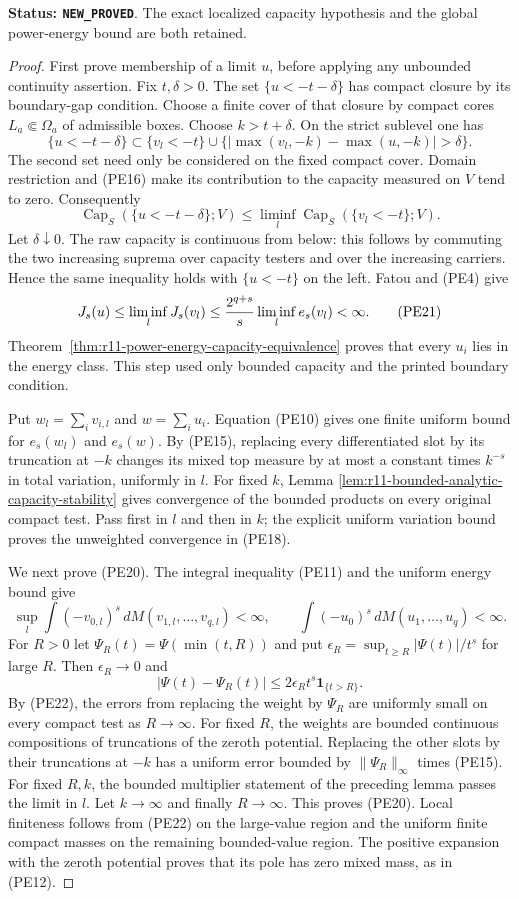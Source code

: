 \noindent\textbf{Status: \texttt{NEW\_PROVED}}. The exact
localized capacity hypothesis and the global power-energy bound
are both retained.

\begin{proof}
First prove membership of a limit $u$, before applying any
unbounded continuity assertion. Fix $t,\delta>0$. The set
$\{u<-t-\delta\}$ has compact closure by its boundary-gap
condition. Choose a finite cover of that closure by compact
cores $L_a\Subset\Omega_a$ of admissible boxes. Choose
$k>t+\delta$. On the strict sublevel one has
\[
 \{u<-t-\delta\}
 \subset\{v_l<-t\}\cup
       \{|\max(v_l,-k)-\max(u,-k)|>\delta\}.
\]
The second set need only be considered on the fixed compact
cover. Domain restriction and (PE16) make its contribution to
the capacity measured on $V$ tend to zero. Consequently
\[
 \operatorname{Cap}_S(\{u<-t-\delta\};V)
       \leq\liminf_l\operatorname{Cap}_S(\{v_l<-t\};V).
\]
Let $\delta\downarrow0$. The raw capacity is continuous from
below: this follows by commuting the two increasing suprema
over capacity testers and over the increasing carriers. Hence
the same inequality holds with $\{u<-t\}$ on the left.
Fatou and (PE4) give
\[
 J_s(u)\leq\liminf_lJ_s(v_l)
       \leq {2^{q+s}\over s}\liminf_l e_s(v_l)<\infty.
 \tag{PE21}
\]
Theorem~\ref{thm:r11-power-energy-capacity-equivalence} proves
that every $u_i$ lies in the energy class. This step used only
bounded capacity and the printed boundary condition.

Put $w_l=\sum_i v_{i,l}$ and $w=\sum_i u_i$.
Equation (PE10) gives one finite uniform bound for $e_s(w_l)$
and $e_s(w)$. By (PE15), replacing every differentiated slot
by its truncation at $-k$ changes its mixed top measure by at
most a constant times $k^{-s}$ in total variation, uniformly
in $l$. For fixed $k$, Lemma
\ref{lem:r11-bounded-analytic-capacity-stability} gives convergence
of the bounded products on every original compact test.
Pass first in $l$ and then in $k$; the explicit uniform
variation bound proves the unweighted convergence in (PE18).

We next prove (PE20). The integral inequality (PE11) and the
uniform energy bound give
\[
 \sup_l\int(-v_{0,l})^s\,dM(v_{1,l},\ldots,v_{q,l})<\infty,
 \qquad
 \int(-u_0)^s\,dM(u_1,\ldots,u_q)<\infty.
 \tag{PE22}
\]
For $R>0$ let $\Psi_R(t)=\Psi(\min(t,R))$ and put
$\epsilon_R=\sup_{t\geq R}|\Psi(t)|/t^s$ for large $R$.
Then $\epsilon_R\to0$ and
\[
          |\Psi(t)-\Psi_R(t)|
                \leq2\epsilon_R t^s\mathbf1_{\{t>R\}}.
\]
By (PE22), the errors from replacing the weight by $\Psi_R$
are uniformly small on every compact test as $R\to\infty$.
For fixed $R$, the weights are bounded continuous compositions
of truncations of the zeroth potential. Replacing the other
slots by their truncations at $-k$ has a uniform error bounded
by $\|\Psi_R\|_\infty$ times (PE15). For fixed $R,k$, the
bounded multiplier statement of the preceding lemma passes
the limit in $l$. Let $k\to\infty$ and finally $R\to\infty$.
This proves (PE20). Local finiteness follows from (PE22) on
the large-value region and the uniform finite compact masses
on the remaining bounded-value region. The positive expansion
with the zeroth potential proves that its pole has zero mixed
mass, as in (PE12).


\end{proof}
